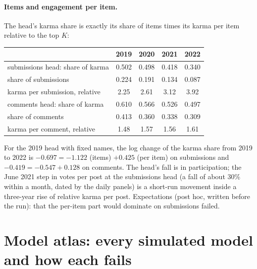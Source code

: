 \documentclass[10pt]{article}
\begin{document}
\paragraph{Items and engagement per item.} The head's karma share is exactly its share of items times its karma per item relative to the top $K$:
\begin{center}\small\begin{tabular}{lcccc}
\toprule
 & 2019 & 2020 & 2021 & 2022\\
\midrule
submissions head: share of karma & 0.502 & 0.498 & 0.418 & 0.340\\
\quad share of submissions & 0.224 & 0.191 & 0.134 & 0.087\\
\quad karma per submission, relative & 2.25 & 2.61 & 3.12 & 3.92\\
comments head: share of karma & 0.610 & 0.566 & 0.526 & 0.497\\
\quad share of comments & 0.413 & 0.360 & 0.338 & 0.309\\
\quad karma per comment, relative & 1.48 & 1.57 & 1.56 & 1.61\\
\bottomrule
\end{tabular}\end{center}
For the 2019 head with fixed names, the log change of the karma share from 2019 to 2022 is $-0.697 = -1.122$ (items) $+ 0.425$ (per item) on submissions and $-0.419 = -0.547 + 0.128$ on comments. The head's fall is in participation; the June 2021 step in votes per post at the submissions head (a fall of about 30\% within a month, dated by the daily panels) is a short-run movement inside a three-year rise of relative karma per post. Expectations (post hoc, written before the run): that the per-item part would dominate on submissions failed.

\section{Model atlas: every simulated model and how each fails}\label{sec:null}
\end{document}
